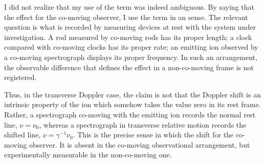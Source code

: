 \documentclass[submitted,11pt]{article}
\begin{document}
\begin{reply}


I did not realize that my use of the term  was indeed ambiguous. By saying that the effect  for the co-moving observer, I use the term in an  sense. The relevant question is what is recorded by measuring devices at rest with the system under investigation. A rod measured by co-moving rods has its proper length; a clock compared with co-moving clocks has its proper rate; an emitting ion observed by a co-moving spectrograph displays its proper frequency. In such an arrangement, the observable difference that defines the effect in a non-co-moving frame is not registered.

Thus, in the transverse Doppler case, the claim is not that the Doppler shift is an intrinsic property of the ion which somehow takes the value zero in its rest frame. Rather, a spectrograph co-moving with the emitting ion records the normal rest line, \(\nu=\nu_0\), whereas a spectrograph in transverse relative motion records the shifted line, \(\nu=\gamma^{-1}\nu_0\). This is the precise sense in which the shift  for the co-moving observer. It is absent in the co-moving observational arrangement, but experimentally measurable in the non-co-moving one.



\end{reply}
\end{document}
